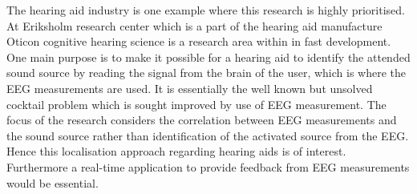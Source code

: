 The hearing aid industry is one example where this research is highly prioritised. At Eriksholm research center which is a part of the hearing aid manufacture Oticon cognitive hearing science is a research area within in fast development. One main purpose is to make it possible for a hearing aid to identify the attended sound source by reading the signal from the brain of the user, which is where the EEG measurements are used\cite{Emina2019}\cite{Bech2018}. It is essentially the well known but unsolved cocktail problem which is sought improved by use of EEG measurement. The focus of the research considers the correlation between EEG measurements and the sound source rather than identification of the activated source from the EEG. Hence this localisation approach regarding hearing aids is of interest. Furthermore a real-time application to provide feedback from EEG measurements would be essential. \\ \\

